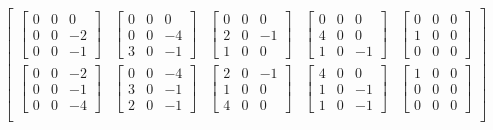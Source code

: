 \documentclass{article}
\begin{document}
\[
  \begin{bmatrix}
    \begin{bmatrix} 0 & 0 & 0 \\ 0 & 0 & -2 \\ 0 & 0 & -1 \end{bmatrix} &
    \begin{bmatrix} 0 & 0 & 0 \\ 0 & 0 & -4 \\ 3 & 0 & -1 \end{bmatrix} &
    \begin{bmatrix} 0 & 0 & 0 \\ 2 & 0 & -1 \\ 1 & 0 & 0 \end{bmatrix} &
    \begin{bmatrix} 0 & 0 & 0 \\ 4 & 0 & 0 \\ 1 & 0 & -1 \end{bmatrix} &
    \begin{bmatrix} 0 & 0 & 0 \\ 1 & 0 & 0 \\ 0 & 0 & 0 \end{bmatrix}   \\

    \begin{bmatrix} 0 & 0 & -2 \\ 0 & 0 & -1 \\ 0 & 0 & -4 \end{bmatrix} &
    \begin{bmatrix} 0 & 0 & -4 \\ 3 & 0 & -1 \\ 2 & 0 & -1 \end{bmatrix} &
    \begin{bmatrix} 2 & 0 & -1 \\ 1 & 0 & 0 \\ 4 & 0 & 0 \end{bmatrix} &
    \begin{bmatrix} 4 & 0 & 0 \\ 1 & 0 & -1 \\ 1 & 0 & -1 \end{bmatrix} &
    \begin{bmatrix} 1 & 0 & 0 \\ 0 & 0 & 0 \\ 0 & 0 & 0 \end{bmatrix}   \\


\end{bmatrix}\]
\end{document}
